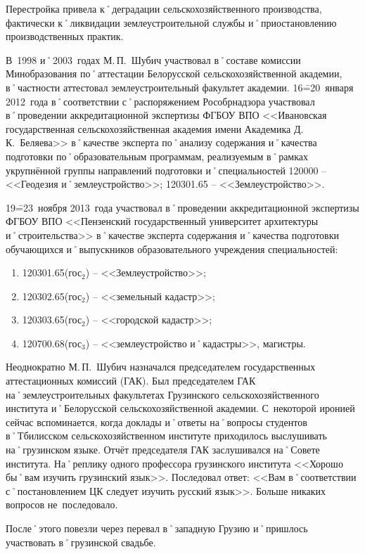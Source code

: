 Перестройка привела к˚деградации сельскохозяйственного производства, фактически к˚ликвидации землеустроительной службы и˚приостановлению производственных практик. 

В~1998 и˚2003~годах М.\,П.~Шубич участвовал в˚составе комиссии Минобразования по˚аттестации Белорусской сельскохозяйственной академии, в˚частности аттестовал землеустроительный факультет академии. 16\==20~января 2012~года в˚соответствии с˚распоряжением Рособрнадзора участвовал в˚проведении аккредитационной экспертизы ФГБОУ ВПО <<Ивановская государственная сельскохозяйственная академия имени Академика Д.\,К.~Беляева>> в˚качестве эксперта по˚анализу содержания и˚качества подготовки по˚образовательным программам, реализуемым в˚рамках укрупнённой группы направлений подготовки и˚специальностей 120000 \--- <<Геодезия и˚землеустройство>>; 120301.65 \--- <<Землеустройство>>.

19\==23~ноября 2013~года участвовал в˚проведении аккредитационной экспертизы ФГБОУ ВПО <<Пензенский государственный университет архитектуры и˚строительства>> в˚качестве эксперта содержания и˚качества подготовки обучающихся и˚выпускников образовательного учреждения специальностей:

\begin{enumerate}
	\item 120301.65(гос$_2$) \--- <<Землеустройство>>; 
	\item 120302.65(гос$_2$) \--- <<земельный кадастр>>; 
	\item 120303.65(гос$_2$) \--- <<городской кадастр>>; 
 	\item 120700.68(гос$_3$) \--- <<землеустройство и˚кадастры>>, магистры.
\end{enumerate}

Неоднократно М.\,П.~Шубич назначался председателем государственных аттестационных комиссий (ГАК). Был председателем ГАК на˚землеустроительных факультетах Грузинского сельскохозяйственного института и˚Белорусской сельскохозяйственной академии. С~некоторой иронией сейчас вспоминается, когда доклады и˚ответы на˚вопросы студентов в˚Тбилисском сельскохозяйственном институте приходилось выслушивать на˚грузинском языке. Отчёт председателя ГАК заслушивался на˚Совете института. На˚реплику одного профессора грузинского института <<Хорошо бы˚вам изучить грузинский язык>>. Последовал ответ: <<Вам в˚соответствии с˚постановлением ЦК следует изучить русский язык>>. Больше никаких вопросов не~последовало.

После˚этого повезли через перевал в˚западную Грузию и˚пришлось участвовать в˚грузинской свадьбе.

